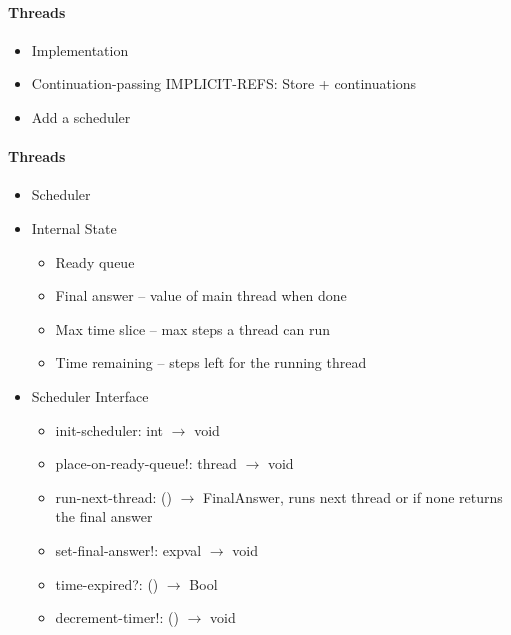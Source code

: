 \documentclass{beamer}
\newcommand{\arrow}{\(\rightarrow\)}
\begin{document}
\begin{frame}[fragile]
\framesubtitle{Threads}
\begin{scriptsize}
\begin{itemize}
\item<1-> Implementation

\item<1-> Continuation-passing IMPLICIT-REFS: Store + continuations

\item<1-> Add a scheduler


\end{itemize}
\end{scriptsize}
\end{frame}

\begin{frame}[fragile]
\framesubtitle{Threads}
\begin{scriptsize}
\begin{itemize}
\item<1-> Scheduler

\item<1-> Internal State
\begin{itemize}
\item Ready queue
\item Final answer – value of main thread when done
\item Max time slice – max steps a thread can run
\item Time remaining – steps left for the running thread
\end{itemize}

\item<2-> Scheduler Interface
\begin{itemize}
\item init-scheduler: int \arrow{} void

\item place-on-ready-queue!: thread \arrow{} void

\item run-next-thread: () \arrow{} FinalAnswer, runs next thread or if none returns the final answer

\item set-final-answer!: expval \arrow{} void

\item time-expired?: () \arrow{} Bool

\item decrement-timer!: () \arrow{} void
\end{itemize}

\end{itemize}
\end{scriptsize}
\end{frame}
\end{document}
